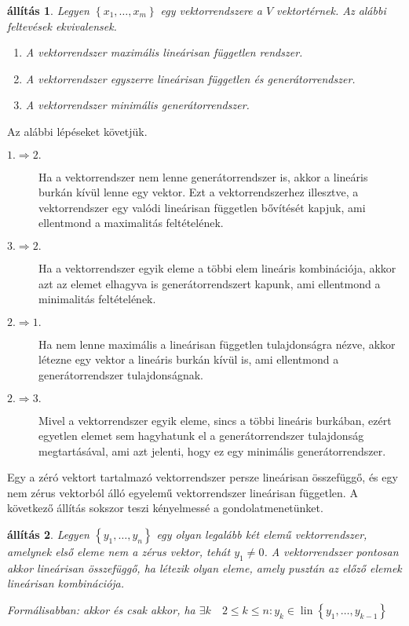 \documentclass[9pt, a4paper, showtrims]{memoir}
\makeatletter
\renewenvironment{proof}[1][\proofname]
    {\par\pushQED{\qed}%
    \normalfont \topsep6\p@\@plus6\p@\relax
    \trivlist
    \item[\hskip\labelsep
        \itshape
    #1\@addpunct{:}]\ignorespaces}
    {\popQED\endtrivlist\@endpefalse}
\theoremstyle{plain}
\newtheorem{proposition}{állítás}[chapter]
\theoremstyle{remark}
\theoremstyle{definition}
\DeclareMathOperator{\lin}{lin}
\makeatother
\begin{document}
\begin{proposition}
    Legyen $\left\{ x_1,\dots,x_m \right\}$ egy vektorrendszere a $V$ vektortérnek.
    Az alábbi feltevések ekvivalensek.
    \begin{enumerate}
        \item A vektorrendszer maximális lineárisan független rendszer.
        \item A vektorrendszer egyszerre lineárisan független és generátorrendszer.
        \item A vektorrendszer minimális generátorrendszer.\qedhere
    \end{enumerate}
\end{proposition}
\begin{proof}
    Az alábbi lépéseket követjük.
    \begin{description}
        \item[$1.\Rightarrow 2.$]
            Ha a vektorrendszer nem lenne generátorrendszer is,
            akkor a lineáris burkán kívül lenne egy vektor.
            Ezt a vektorrendszerhez illesztve, a vektorrendszer egy valódi lineárisan független bővítését kapjuk,
            ami ellentmond a maximalitás feltételének.
        \item[$3.\Rightarrow 2.$]
            Ha a vektorrendszer egyik eleme a többi elem lineáris kombinációja,
            akkor azt az elemet elhagyva is generátorrendszert kapunk,
            ami ellentmond a minimalitás feltételének.
        \item[$2.\Rightarrow 1.$]
            Ha nem lenne maximális a lineárisan független tulajdonságra nézve,
            akkor létezne egy vektor a lineáris burkán kívül is,
            ami ellentmond a generátorrendszer tulajdonságnak.
        \item[$2.\Rightarrow 3.$]
            Mivel a vektorrendszer egyik eleme, sincs a többi lineáris burkában,
            ezért egyetlen elemet sem hagyhatunk el a generátorrendszer tulajdonság megtartásával,
            ami azt jelenti, hogy ez egy minimális generátorrendszer.\qedhere
    \end{description}
\end{proof}
Egy a zéró vektort tartalmazó vektorrendszer persze lineárisan összefüggő, 
és egy nem zérus vektorból álló egyelemű vektorrendszer lineárisan független.
A következő állítás sokszor teszi kényelmessé a gondolatmenetünket. 
\begin{proposition}
    Legyen $\left\{ y_1,\dots,y_n \right\}$ egy olyan legalább két elemű vektorrendszer,
    amelynek első eleme nem a zérus vektor, tehát $y_1\neq 0$.
    A vektorrendszer pontosan akkor lineárisan összefüggő,
    ha létezik olyan eleme, 
    amely pusztán az előző elemek lineárisan kombinációja.

    Formálisabban: akkor és csak akkor, 
    ha 
    $\exists k\quad 2\leq k\leq n : y_k\in\lin\left\{ y_1,\dots,y_{k-1} \right\}$
\end{proposition}
\end{document}
